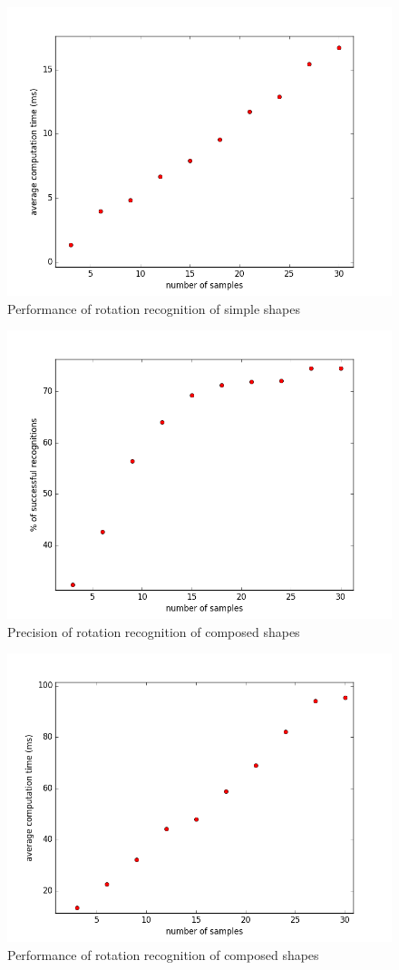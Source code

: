 \begin{figure}
\centering
\includegraphics[width=.8\linewidth]{ext/rotation_simple_speed.png}
\caption{Performance of rotation recognition of simple shapes}
\label{fig:rotation_simple_speed}
\end{figure}

\begin{figure}
\centering
\includegraphics[width=.8\linewidth]{ext/rotation_comp_precision.png}
\caption{Precision of rotation recognition of composed shapes}
\label{fig:rotation_comp_precision}
\end{figure}

\begin{figure}
\centering
\includegraphics[width=.8\linewidth]{ext/rotation_comp_speed.png}
\caption{Performance of rotation recognition of composed shapes}
\label{fig:rotation_comp_speed}
\end{figure}

